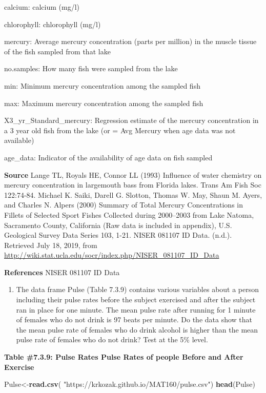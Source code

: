\documentclass[
]{book}
\newenvironment{Shaded}{\begin{snugshade}}{\end{snugshade}}
\newcommand{\KeywordTok}[1]{\textcolor[rgb]{0.13,0.29,0.53}{\textbf{#1}}}
\newcommand{\NormalTok}[1]{#1}
\newcommand{\StringTok}[1]{\textcolor[rgb]{0.31,0.60,0.02}{#1}}
\providecommand{\tightlist}{%
  \setlength{\itemsep}{0pt}\setlength{\parskip}{0pt}}
\begin{document}
calcium: calcium (mg/l)

chlorophyll: chlorophyll (mg/l)

mercury: Average mercury concentration (parts per million) in the muscle tissue of the fish sampled from that lake

no.samples: How many fish were sampled from the lake

min: Minimum mercury concentration among the sampled fish

max: Maximum mercury concentration among the sampled fish

X3\_yr\_Standard\_mercury: Regression estimate of the mercury concentration in a 3 year old fish from the lake (or = Avg Mercury when age data was not available)

age\_data: Indicator of the availability of age data on fish sampled

\textbf{Source}
Lange TL, Royals HE, Connor LL (1993) Influence of water chemistry on mercury concentration in largemouth bass from Florida lakes. Trans Am Fish Soc 122:74-84.
Michael K. Saiki, Darell G. Slotton, Thomas W. May, Shaun M. Ayers, and Charles N. Alpers (2000) Summary of Total Mercury Concentrations in Fillets of Selected Sport Fishes Collected during 2000--2003 from Lake Natoma, Sacramento County, California (Raw data is included in appendix), U.S. Geological Survey Data Series 103, 1-21.
NISER 081107 ID Data. (n.d.). Retrieved July 18, 2019, from \url{http://wiki.stat.ucla.edu/socr/index.php/NISER_081107_ID_Data}

\textbf{References}
NISER 081107 ID Data

\begin{enumerate}
\def\labelenumi{\arabic{enumi}.}
\setcounter{enumi}{3}
\tightlist
\item
  The data frame Pulse (Table 7.3.9) contains various variables about a person including their pulse rates before the subject exercised and after the subject ran in place for one minute. The mean pulse rate after running for 1 minute of females who do not drink is 97 beats per minute. Do the data show that the mean pulse rate of females who do drink alcohol is higher than the mean pulse rate of females who do not drink? Test at the 5\% level.
\end{enumerate}

\textbf{Table \#7.3.9: Pulse Rates Pulse Rates of people Before and After Exercise}

\begin{Shaded}
\begin{Highlighting}[]
\NormalTok{Pulse<-}\KeywordTok{read.csv}\NormalTok{(}
  \StringTok{"https://krkozak.github.io/MAT160/pulse.csv"}\NormalTok{)}
\KeywordTok{head}\NormalTok{(Pulse)}
\end{Highlighting}
\end{Shaded}
\end{document}
